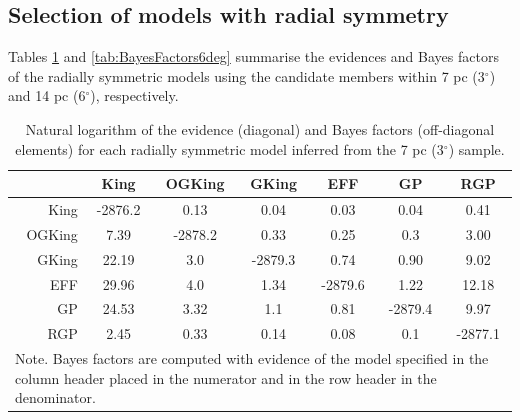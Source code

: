 \subsection{Selection of models with radial symmetry} 

Tables \ref{tab:BayesFactors3deg} and \ref{tab:BayesFactors6deg} summarise the evidences and Bayes factors of the radially symmetric models using the candidate members within  7 pc (3$^{\circ}$) and 14 pc (6$^{\circ}$), respectively. 
\begin{table}[ht]
  \centering
      \caption{Natural logarithm of the evidence (diagonal) and Bayes factors (off-diagonal elements) for each radially symmetric model inferred from the 7 pc (3$^\circ$) sample.}
         \begin{tabular}{rcccccc}
           & King & OGKing  &   GKing & EFF & GP & RGP \\
\hline              
           King    &-2876.2 &  0.13   &   0.04  &  0.03   &   0.04  &  0.41  \\
           OGKing  &   7.39     &-2878.2  &   0.33  &  0.25   &   0.3   &  3.00  \\
           GKing   &    22.19    &    3.0     &-2879.3  &  0.74   &   0.90  &  9.02  \\
           EFF     &    29.96    &      4.0   &   1.34      &-2879.6  &   1.22  & 12.18  \\
           GP      &    24.53    &     3.32    &   1.1      &    0.81     &-2879.4  &  9.97  \\
           RGP     &   2.45     &     0.33    &    0.14     &      0.08   &   0.1      &-2877.1 \\
           \hline
\multicolumn{7}{l}{
  \begin{minipage}{12cm}
    {\footnotesize Note. Bayes factors are computed with evidence of the model specified in the column header placed in the numerator and in the row header in the denominator.}
  \end{minipage}
}
\end{tabular}
        
  \label{tab:BayesFactors3deg}
   \end{table}
   
